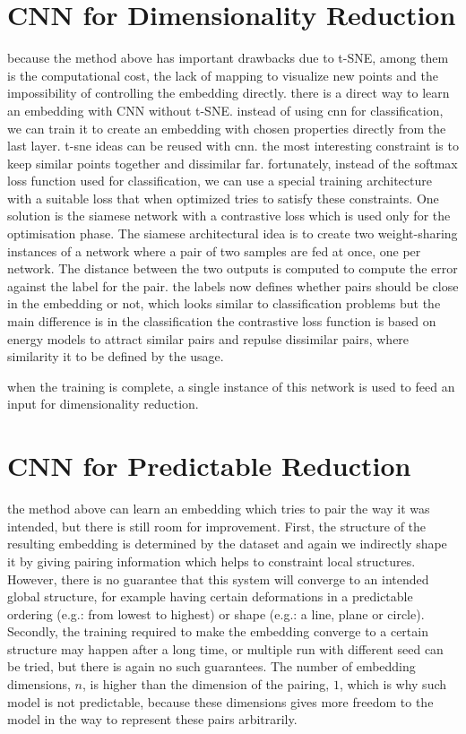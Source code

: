 \documentclass[a4paper,12pt]{report}
\newcommand{\eg}{e.g.}
\begin{document}
\section{CNN for Dimensionality Reduction}
because the method above has important drawbacks due to t-SNE, among them is the computational cost, the lack of mapping to visualize new points and the impossibility of controlling the embedding directly.
there is a direct way to learn an embedding with CNN without t-SNE.
instead of using cnn for classification, we can train it to create an embedding with chosen properties directly from the last layer.
t-sne ideas can be reused with cnn.
the most interesting constraint is to keep similar points together and dissimilar far.
fortunately, instead of the softmax loss function used for classification, we can use a special training architecture with a suitable loss that when optimized tries to satisfy these constraints.
One solution is the siamese network with a contrastive loss which is used only for the optimisation phase.
The siamese architectural idea is to create two weight-sharing instances of a network where a pair of two samples are fed at once, one per network.
The distance between the two outputs is computed to compute the error against the label for the pair.
the labels now defines whether pairs should be close in the embedding or not, which looks similar to classification problems but the main difference is in the classification
the contrastive loss function is based on energy models to attract similar pairs and repulse dissimilar pairs, where similarity it to be defined by the usage.

when the training is complete, a single instance of this network is used to feed an input for dimensionality reduction.

\section{CNN for Predictable Reduction}
the method above can learn an embedding which tries to pair the way it was intended, but there is still room for improvement.
First, the structure of the resulting embedding is determined by the dataset and again we indirectly shape it by giving pairing information which helps to constraint local structures.
However, there is no guarantee that this system will converge to an intended global structure, for example having certain deformations in a predictable ordering (\eg: from lowest to highest) or shape (\eg: a line, plane or circle).
Secondly, the training required to make the embedding converge to a certain structure may happen after a long time, or multiple run with different seed can be tried, but there is again no such guarantees.
The number of embedding dimensions, $n$, is higher than the dimension of the pairing, $1$, which is why such model is not predictable, because these dimensions gives more freedom to the model in the way to represent these pairs arbitrarily.
\end{document}
